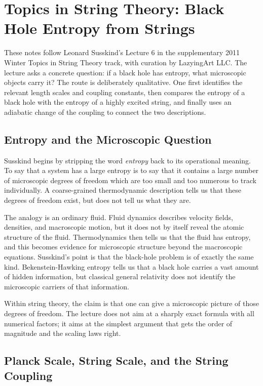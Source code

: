\chapter{Topics in String Theory: Black Hole Entropy from Strings}

These notes follow Leonard Susskind's Lecture 6 in the supplementary 2011 Winter Topics in String Theory track, with curation by LazyingArt LLC. The lecture asks a concrete question: if a black hole has entropy, what microscopic objects carry it? The route is deliberately qualitative. One first identifies the relevant length scales and coupling constants, then compares the entropy of a black hole with the entropy of a highly excited string, and finally uses an adiabatic change of the coupling to connect the two descriptions.

\section{Entropy and the Microscopic Question}

Susskind begins by stripping the word \emph{entropy} back to its operational meaning. To say that a system has a large entropy is to say that it contains a large number of microscopic degrees of freedom which are too small and too numerous to track individually. A coarse-grained thermodynamic description tells us that these degrees of freedom exist, but does not tell us what they are.

The analogy is an ordinary fluid. Fluid dynamics describes velocity fields, densities, and macroscopic motion, but it does not by itself reveal the atomic structure of the fluid. Thermodynamics then tells us that the fluid has entropy, and this becomes evidence for microscopic structure beyond the macroscopic equations. Susskind's point is that the black-hole problem is of exactly the same kind. Bekenstein-Hawking entropy tells us that a black hole carries a vast amount of hidden information, but classical general relativity does not identify the microscopic carriers of that information.

Within string theory, the claim is that one can give a microscopic picture of those degrees of freedom. The lecture does not aim at a sharply exact formula with all numerical factors; it aims at the simplest argument that gets the order of magnitude and the scaling laws right.

\section{Planck Scale, String Scale, and the String Coupling}

